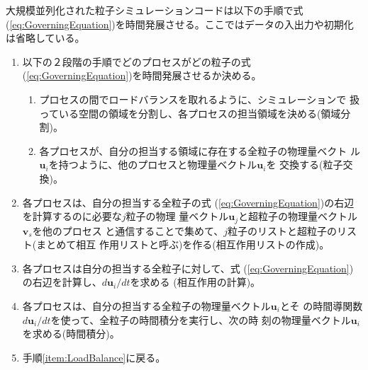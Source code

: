 大規模並列化された粒子シミュレーションコードは以下の手順で式(\ref{eq:GoverningEquation})を時間発展させる。ここではデータの入出力や初期化は省略している。
\begin{enumerate}
\item 以下の２段階の手順でどのプロセスがどの粒子の式
  (\ref{eq:GoverningEquation})を時間発展させるか決める。
  \label{item:LoadBalance}
  \begin{enumerate}
  \item プロセスの間でロードバランスを取れるように、シミュレーションで
    扱っている空間の領域を分割し、各プロセスの担当領域を決める(領域分
    割)。
  \item 各プロセスが、自分の担当する領域に存在する全粒子の物理量ベクト
    ル$\bm{u}_i$を持つように、他のプロセスと物理量ベクトル$\bm{u}_i$を
    交換する(粒子交換)。
  \end{enumerate}

\item 各プロセスは、自分の担当する全粒子の式
  (\ref{eq:GoverningEquation})の右辺を計算するのに必要な$j$粒子の物理
  量ベクトル$\bm{u}_j$と超粒子の物理量ベクトル$\bm{v}_s$を他のプロセス
  と通信することで集めて、$j$粒子のリストと超粒子のリスト(まとめて相互
  作用リストと呼ぶ)を作る(相互作用リストの作成)。
  \label{item:MakeInteractionList}

\item 各プロセスは自分の担当する全粒子に対して、式
  (\ref{eq:GoverningEquation})の右辺を計算し、$d\bm{u}_i/dt$を求める
  (相互作用の計算)。\label{item:CalcInteraction}

\item 各プロセスは、自分の担当する全粒子の物理量ベクトル$\bm{u}_i$とそ
  の時間導関数$d\bm{u}_i/dt$を使って、全粒子の時間積分を実行し、次の時
  刻の物理量ベクトル$\bm{u}_i$を求める(時間積分)。
  \label{item:IntegrateTime}

\item 手順\ref{item:LoadBalance}に戻る。        
\end{enumerate}

